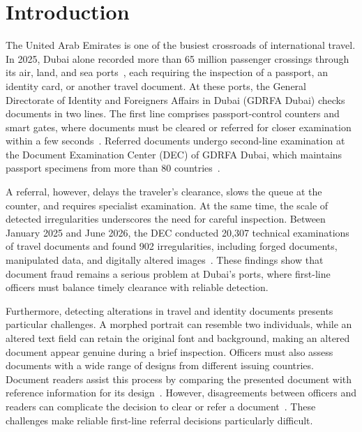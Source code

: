 \documentclass[12pt,a4paper]{article}
\begin{document}
\section{Introduction}
\label{sec:intro}

The United Arab Emirates is one of the busiest crossroads of international travel. In 2025, Dubai alone recorded more than 65 million passenger crossings through its air, land, and sea ports~\cite{gdrfa2025stats}, each requiring the inspection of a passport, an identity card, or another travel document. At these ports, the General Directorate of Identity and Foreigners Affairs in Dubai (GDRFA Dubai) checks documents in two lines. The first line comprises passport-control counters and smart gates, where documents must be cleared or referred for closer examination within a few seconds~\cite{frontex2023quickcheck}. Referred documents undergo second-line examination at the Document Examination Center (DEC) of GDRFA Dubai, which maintains passport specimens from more than 80 countries~\cite{gulfnews2026forgery}.

A referral, however, delays the traveler's clearance, slows the queue at the counter, and requires specialist examination. At the same time, the scale of detected irregularities underscores the need for careful inspection. Between January 2025 and June 2026, the DEC conducted 20,307 technical examinations of travel documents and found 902 irregularities, including forged documents, manipulated data, and digitally altered images~\cite{gulfnews2026forgery}. These findings show that document fraud remains a serious problem at Dubai's ports, where first-line officers must balance timely clearance with reliable detection.

Furthermore, detecting alterations in travel and identity documents presents particular challenges. A morphed portrait can resemble two individuals, while an altered text field can retain the original font and background, making an altered document appear genuine during a brief inspection. Officers must also assess documents with a wide range of designs from different issuing countries. Document readers assist this process by comparing the presented document with reference information for its design~\cite{regula2023templates}. However, disagreements between officers and readers can complicate the decision to clear or refer a document~\cite{gariup2019firstline}. These challenges make reliable first-line referral decisions particularly difficult.
\end{document}
